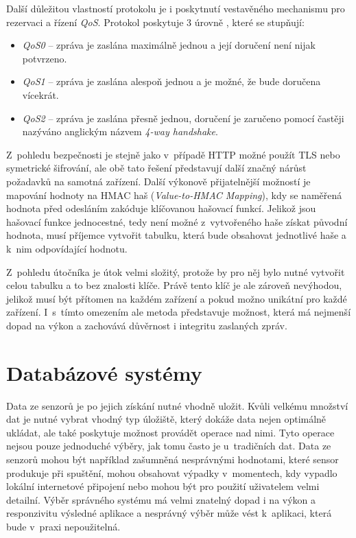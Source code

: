Další důležitou vlastností protokolu je i poskytnutí vestavěného mechanismu pro rezervaci a řízení \textit{QoS}. Protokol poskytuje 3 úrovně \cite{soni2017survey}, které se stupňují:
\begin{itemize}
\item \textit{QoS0} -- zpráva je zaslána maximálně jednou a její doručení není nijak potvrzeno.
\item \textit{QoS1} -- zpráva je zaslána alespoň jednou a je možné, že bude doručena vícekrát.
\item \textit{QoS2} -- zpráva je zaslána přesně jednou, doručení je zaručeno pomocí  častěji nazýváno anglickým názvem \textit{4-way handshake}.
\end{itemize}

Z~pohledu bezpečnosti je stejně jako v~případě HTTP možné použít TLS nebo symetrické šifrování, ale obě tato řešení představují další značný nárůst požadavků \cite{dinculeanua2019vulnerabilities} na samotná zařízení. Další výkonově přijatelnější možností je mapování hodnoty na HMAC haš (\textit{Value-to-HMAC Mapping}), kdy se naměřená hodnota před odesláním zakóduje klíčovanou hašovací funkcí. Jelikož jsou hašovací funkce jednocestné, tedy není možné z~vytvořeného haše získat původní hodnota, musí příjemce vytvořit tabulku, která bude obsahovat jednotlivé haše a k~nim odpovídající hodnotu.

Z~pohledu útočníka je útok velmi složitý, protože by pro něj bylo nutné vytvořit celou tabulku a to bez znalosti klíče. Právě tento klíč je ale zároveň nevýhodou, jelikož musí být přítomen na každém zařízení a pokud možno unikátní pro každé zařízení. I~s~tímto omezením ale metoda představuje možnost, která má nejmenší dopad na výkon a zachovává důvěrnost i integritu zaslaných zpráv.

\chapter{Databázové systémy}
\label{chapter_db}
Data ze senzorů je po jejich získání nutné vhodně uložit. Kvůli velkému množství dat je nutné vybrat vhodný typ úložiště, který dokáže data nejen optimálně ukládat, ale také poskytuje možnost provádět operace nad nimi. Tyto operace nejsou pouze jednoduché výběry, jak tomu často je u~tradičních dat. Data ze senzorů mohou být například zašumněná nesprávnými hodnotami, které sensor produkuje při spuštění, mohou obsahovat výpadky v~momentech, kdy vypadlo lokální internetové připojení nebo mohou být pro použití uživatelem velmi detailní. Výběr správného systému má velmi znatelný dopad i na výkon a responzivitu výsledné aplikace a nesprávný výběr může vést k~aplikaci, která bude v~praxi nepoužitelná.

